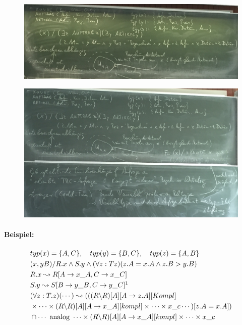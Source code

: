 \documentclass[12pt, a4paper]{article}
\begin{document}
\begin{figure}
\centering
\includegraphics[width=0.7\linewidth]{img/img22}
\caption{}
\label{fig:img22}
\end{figure}

\begin{figure}
\centering
\includegraphics[width=0.7\linewidth]{img/img23}
\caption{}
\label{fig:img23}
\end{figure}

\paragraph{Beispiel:} 
\begin{align*}
&typ(x) = \{A,C\}, \quad typ(y) = \{B,C\}, \quad typ(z) = \{A,B\} \\
& (x,y B) / R.x \wedge S.y \wedge (\forall z: Tz)(z.A = x.A \wedge z.B > y.B) \\
& R.x \leadsto R[A \rightarrow x\_A, C \rightarrow x\_C] \\
& S.y \leadsto S[B \rightarrow y\_B, C \rightarrow y\_C]\footnotemark \\
& (\forall z: T.z)(\cdots) \leadsto ((( R \backslash R)[A][A \rightarrow z.A][Kompl]  \\
&\times \cdots \times (R \backslash R)[A][A \rightarrow x\_A][kompl] \times \cdots \times x\_c \cdots)[z.A = x.A]) \\
&\cap \cdots \text{ analog } \cdots \times (R \backslash R)[A][A \rightarrow x\_A][kompl] \times \cdots \times x\_c
\end{align*}

\end{document}
